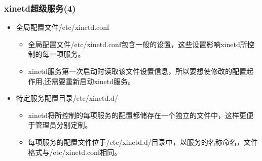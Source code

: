 \documentclass[xcolor=svgnames,presentation]{beamer}
\begin{document}
\begin{frame}
\frametitle{xinetd超级服务(4)}
\label{sec-7-9}
\begin{itemize}

\item 全局配置文件/etc/xinetd.conf
\label{sec-7-9-1}%
\begin{itemize}

\item 全局配置文件/etc/xinetd.conf包含一般的设置，这些设置影响xinetd所控制的每一项服务。
\label{sec-7-9-1-1}%

\item xinetd服务第一次启动时读取该文件设置信息，所以要想使修改的配置起作用,还需要重新启动xinetd服务。
\label{sec-7-9-1-2}%
\end{itemize} %

\item 特定服务配置目录/etc/xinetd.d/
\label{sec-7-9-2}%
\begin{itemize}

\item xinetd将所控制的每项服务的配置都储存在一个独立的文件中，这样更便于管理员分别定制。
\label{sec-7-9-2-1}%

\item 每项服务的配置文件位于/etc/xinetd.d/目录中，以服务的名称命名，文件格式与/etc/xinetd.conf相同。
\label{sec-7-9-2-2}%

\end{itemize} %
\end{itemize} %
\end{frame}
\end{document}
